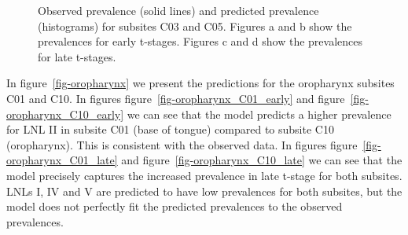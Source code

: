 \documentclass[
  sn-mathphys-num,
]{sn-jnl}
\begin{document}
\begin{figure}
\begin{minipage}{\linewidth}
{}

\subcaption{\label{fig-oral_cavity_C03_late}}

\end{minipage}%
\newline
\begin{minipage}{\linewidth}


\subcaption{\label{fig-oral_cavity_C05_late}}

\end{minipage}%

\caption{\label{fig-oral_cavity}Observed prevalence (solid lines) and
predicted prevalence (histograms) for subsites C03 and C05. Figures a
and b show the prevalences for early t-stages. Figures c and d show the
prevalences for late t-stages.}

\end{figure}%

In figure~\ref{fig-oropharynx} we present the predictions for the
oropharynx subsites C01 and C10. In figures
figure~\ref{fig-oropharynx_C01_early} and
figure~\ref{fig-oropharynx_C10_early} we can see that the model predicts
a higher prevalence for LNL II in subsite C01 (base of tongue) compared
to subsite C10 (oropharynx). This is consistent with the observed data.
In figures figure~\ref{fig-oropharynx_C01_late} and
figure~\ref{fig-oropharynx_C10_late} we can see that the model precisely
captures the increased prevalence in late t-stage for both subsites.
LNLs I, IV and V are predicted to have low prevalences for both
subsites, but the model does not perfectly fit the predicted prevalences
to the observed prevalences.
\end{document}

